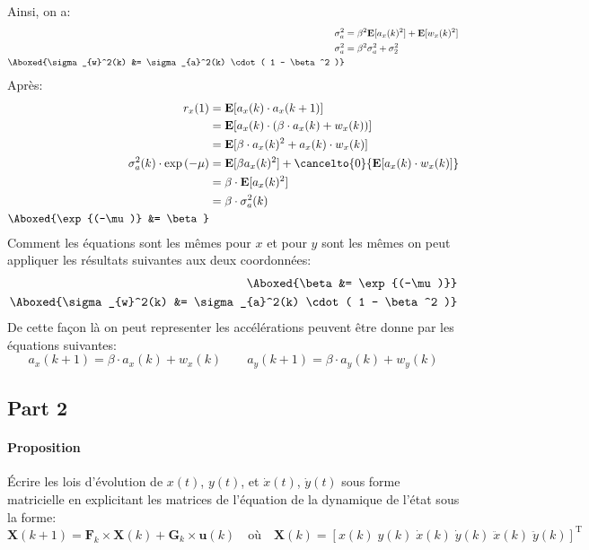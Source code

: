 \documentclass{article}
\begin{document}
\noindent Ainsi, on a:
\begin{align*}
    \sigma_{a}^2 &= \beta^2 \mathbf{E}[a_{x}(k)^{2}] + \mathbf{E}[w_{x}(k)^2]\\
    \sigma_{a}^2 &= \beta^2 \sigma_{a}^2 + \sigma_{2}^2\\
    \Aboxed{\sigma_{w}^2(k) &= \sigma_{a}^2(k) \cdot ( 1 - \beta^2 )}
\end{align*}
\begin{equation*}
\end{equation*}
Après:
\begin{align*}
    r_{x}(1) &= \mathbf{E}[a_{x}(k) \cdot a_{x}(k+1)]\\
    &= \mathbf{E}[a_{x}(k) \cdot (\beta \cdot a_{x}(k) + w_{x}(k))]\\
    &= \mathbf{E}[\beta \cdot a_{x}(k)^{2} + a_{x}(k) \cdot w_{x}(k)]\\
    \sigma_{a}^{2}(k) \cdot \exp{(-\mu)} &= \mathbf{E}[\beta a_{x}(k)^{2}] + \cancelto{0}{\mathbf{E}[a_{x}(k) \cdot w_{x}(k)]}\\
    &= \beta \cdot \mathbf{E}[a_{x}(k)^{2}]\\
    &= \beta \cdot \sigma_{a}^2(k)\\
    \Aboxed{\exp{(-\mu)} &= \beta}
\end{align*}
Comment les équations sont les mêmes pour $x$ et pour $y$ sont les mêmes on peut appliquer les résultats suivantes aux deux coordonnées:
\begin{align}
    \Aboxed{\beta &= \exp{(-\mu)}}\\
    \Aboxed{\sigma_{w}^2(k) &= \sigma_{a}^2(k) \cdot ( 1 - \beta^2 )}
\end{align}
De cette façon là on peut representer les accélérations peuvent être donne par les équations suivantes:
\begin{equation}
    \boxed{a_{x}(k+1) = \beta \cdot a_{x}(k) + w_{x}(k)}
    \qquad
    \boxed{a_{y}(k+1) = \beta \cdot a_{y}(k) + w_{y}(k)}
\end{equation}

\subsection{Part 2}
\paragraph{Proposition}Écrire les lois d'évolution de $x(t)$, $y(t)$, et $\dot{x}(t)$, $\dot{y}(t)$ sous forme matricielle en explicitant les matrices de l'équation de la dynamique de l'état sous la forme:
\begin{equation}
    \mathbf{X}(k+1) = \mathbf{F}_{k} \times \mathbf{X}(k) + \mathbf{G}_{k} \times \mathbf{u}(k)
    \quad
    \text{où}
    \quad
    \mathbf{X}(k) = [x(k)\;y(k)\;\dot{x}(k)\;\dot{y}(k)\;\ddot{x}(k)\;\ddot{y}(k)]^{\text{T}}
\end{equation}
\end{document}

